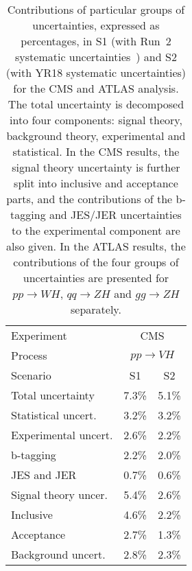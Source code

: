 \begin{table}[th!]
\begin{center}
{
\caption{Contributions of particular groups of uncertainties, expressed as percentages, in S1 (with Run~2 systematic uncertainties~\cite{HIG16044}) and S2 (with YR18 systematic uncertainties) for the CMS and ATLAS analysis. The total uncertainty is decomposed into four components: signal theory, background theory, experimental and statistical. In the CMS results, the signal theory uncertainty is further split into inclusive and acceptance parts, and the contributions of the b-tagging and JES/JER uncertainties to the experimental component are also given. In the ATLAS results, the contributions of the four groups of uncertainties are presented for $pp\to WH$, $qq\to ZH$ and $gg\to ZH$ separately.}
\label{tab:vhbb_uncertbreakdown}
\begin{subtable}
\begin{tabular}{l | c c  }
\hline\hline
Experiment & \multicolumn{2}{c}{CMS} \\
Process & \multicolumn{2}{c}{$pp\to VH$}\\ 
\hline
Scenario & S1 & S2 \\
Total uncertainty   & 7.3\%  & 5.1\% \\
\hline
Statistical uncert. & 3.2\% & 3.2\%  \\
Experimental uncert. & 2.6\% & 2.2\% \\
\quad b-tagging & 2.2\%  & 2.0\% \\
\quad JES and JER & 0.7\%  & 0.6\% \\
Signal theory uncer.& 5.4\% & 2.6\% \\
\quad Inclusive & 4.6\% &2.2\%  \\
\quad Acceptance & 2.7\% &1.3\% \\
Background uncert. & 2.8\% & 2.3\%\\
\hline\hline
\end{tabular}
\end{subtable}

}
\end{center}
\end{table}
